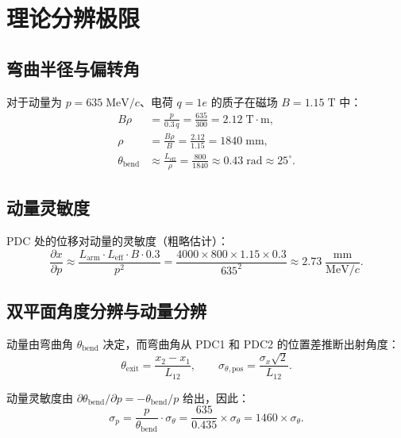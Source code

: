 \documentclass[a4paper, 11pt]{article}
\begin{document}
\section{理论分辨极限}
\label{sec:theory}

\subsection{弯曲半径与偏转角}

对于动量为 $p = 635\;\mathrm{MeV}/c$、电荷 $q = 1e$ 的质子在磁场 $B = 1.15\;\mathrm{T}$ 中：
\begin{align}
  B\rho &= \frac{p}{0.3\,q} = \frac{635}{300} = 2.12\;\mathrm{T{\cdot}m}, \\
  \rho &= \frac{B\rho}{B} = \frac{2.12}{1.15} = 1840\;\mathrm{mm}, \\
  \theta_\mathrm{bend} &\approx \frac{L_\mathrm{eff}}{\rho}
  = \frac{800}{1840} \approx 0.43\;\mathrm{rad} \approx 25^\circ.
\end{align}

\subsection{动量灵敏度}

PDC 处的位移对动量的灵敏度（粗略估计）：
\begin{equation}
  \frac{\partial x}{\partial p} \approx
  \frac{L_\mathrm{arm} \cdot L_\mathrm{eff} \cdot B \cdot 0.3}{p^2}
  = \frac{4000 \times 800 \times 1.15 \times 0.3}{635^2}
  \approx 2.73\;\frac{\mathrm{mm}}{\mathrm{MeV}/c}.
\end{equation}

\subsection{双平面角度分辨与动量分辨}

动量由弯曲角 $\theta_\mathrm{bend}$ 决定，而弯曲角从 PDC1 和 PDC2 的位置差推断出射角度：
\begin{equation}
  \theta_\mathrm{exit} = \frac{x_2 - x_1}{L_{12}}, \qquad
  \sigma_{\theta,\mathrm{pos}} = \frac{\sigma_x \sqrt{2}}{L_{12}}.
\end{equation}

动量灵敏度由 $\partial\theta_\mathrm{bend}/\partial p = -\theta_\mathrm{bend}/p$ 给出，因此：
\begin{equation}
  \sigma_p = \frac{p}{\theta_\mathrm{bend}} \cdot \sigma_\theta
  = \frac{635}{0.435} \times \sigma_\theta
  = 1460 \times \sigma_\theta.
  \label{eq:sigma_p_from_theta}
\end{equation}
\end{document}
